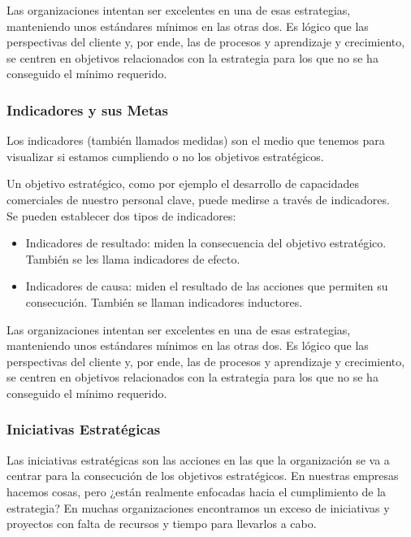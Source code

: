 \documentclass[preprint,12pt]{elsarticle}
\begin{document}
Las organizaciones intentan ser excelentes en una de esas estrategias, manteniendo unos estándares mínimos en las otras dos. Es lógico que las perspectivas del cliente y, por ende, las  de procesos y aprendizaje y crecimiento, se centren en objetivos relacionados con la estrategia para los que no se ha conseguido el mínimo requerido.

\subsubsection{\textbf{Indicadores y sus Metas}}

Los indicadores (también llamados medidas) son el medio que tenemos para visualizar si estamos cumpliendo o no los objetivos estratégicos.

Un objetivo estratégico, como por ejemplo el desarrollo de capacidades comerciales de nuestro personal clave, puede medirse a través de indicadores.
\\

Se pueden establecer dos tipos de indicadores:

	\begin{itemize}
	\item Indicadores de resultado: miden la consecuencia del objetivo estratégico. También se les llama indicadores de efecto.
	\item Indicadores de causa: miden el resultado de las acciones que permiten su consecución. También se llaman indicadores inductores.
	\end{itemize}

Las organizaciones intentan ser excelentes en una de esas estrategias, manteniendo unos estándares mínimos en las otras dos. Es lógico que las perspectivas del cliente y, por ende, las  de procesos y aprendizaje y crecimiento, se centren en objetivos relacionados con la estrategia para los que no se ha conseguido el mínimo requerido.

\subsubsection{\textbf{Iniciativas Estratégicas}}

Las iniciativas estratégicas son las acciones en las que la organización se va a centrar para la consecución de los objetivos estratégicos. En nuestras empresas hacemos cosas, pero ¿están realmente enfocadas hacia el cumplimiento de la estrategia? En muchas organizaciones encontramos un exceso de iniciativas y proyectos con falta de recursos y tiempo para llevarlos a cabo.
\\
\end{document}
